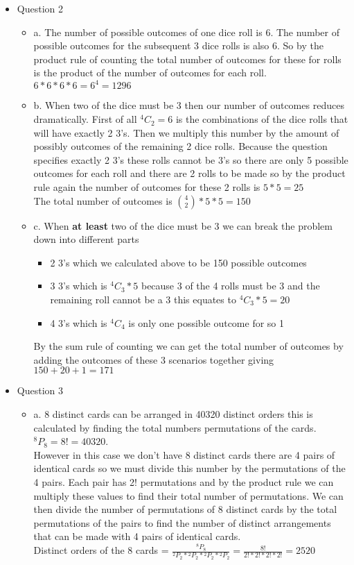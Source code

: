 \documentclass[11pt]{article}
\newcommand*{\Perm}[2]{{}^{#1}\!P_{#2}}%
\newcommand*{\Comb}[2]{{}^{#1}C_{#2}}%
\begin{document}
\begin{itemize}
  \item Question 2
  \begin{itemize}
  	\item a. The number of possible outcomes of one dice roll is 6. The number of possible outcomes for the subsequent 3 dice rolls is also 6. So by the product rule of counting the total number of outcomes for these for rolls is the product of the number of outcomes for each roll.\\
  	$6*6*6*6=6^4=1296$\\
  	\item b. When two of the dice must be 3 then our number of outcomes reduces dramatically. First of all $\Comb{4}{2}=6$ is the combinations of the dice rolls that will have exactly 2 3's. Then we multiply this number by the amount of possibly outcomes of the remaining 2 dice rolls. Because the question specifies exactly 2 3's these rolls cannot be 3's so there are only 5 possible outcomes for each roll and there are 2 rolls to be made so by the product rule again the number of outcomes for these 2 rolls is $5*5=25$\\
  	The total number of outcomes is $\binom 42 *5*5=150$\\
  	\item c. When \textbf{at least} two of the dice must be 3 we can break the problem down into different parts \begin{itemize}
  	\item 2 3's which we calculated above to be 150 possible outcomes
  	\item 3 3's which is $\Comb{4}{3} * 5$ because 3 of the 4 rolls must be 3 and the remaining roll cannot be a 3 this equates to $\Comb{4}{3} * 5=20$
  	\item 4 3's which is $\Comb{4}{4}$ is only one possible outcome for so 1
  	\end{itemize}
  	By the sum rule of counting we can get the total number of outcomes by adding the outcomes of these 3 scenarios together giving $150+20+1=171$\\
  \end{itemize}
  \newpage
  \item Question 3
  \begin{itemize}
  	\item a. 8 distinct cards can be arranged in 40320 distinct orders this is calculated by finding the total numbers  permutations of the cards. $\Perm 88=8!=40320$.\\
  	However in this case we don't have 8 distinct cards there are 4 pairs of identical cards so we must divide this number by the permutations of the 4 pairs. Each pair has 2! permutations and by the product rule we can multiply these values to find their total number of permutations. We can then divide the number of permutations of 8 distinct cards by the total permutations of the pairs to find the number of distinct arrangements that can be made with 4 pairs of identical cards.\\
  	Distinct orders of the 8 cards = $\frac{\Perm88}{\Perm22 *\Perm22 * \Perm22 * \Perm22}=\frac{8!}{2!*2!*2!*2!}=2520$


\end{itemize}
\end{itemize}
\end{document}
